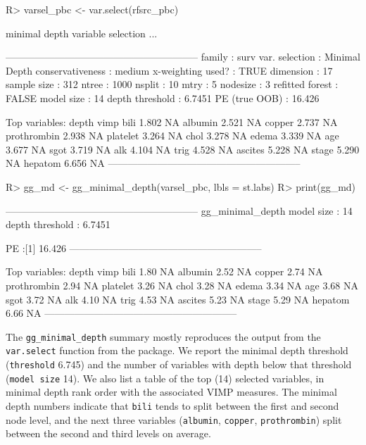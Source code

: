 \documentclass[article]{jss}
\begin{document}
\begin{Schunk}
\begin{Sinput}
R> varsel_pbc <- var.select(rfsrc_pbc)
\end{Sinput}
\begin{Soutput}
minimal depth variable selection ...


-----------------------------------------------------------
family             : surv 
var. selection     : Minimal Depth 
conservativeness   : medium 
x-weighting used?  : TRUE 
dimension          : 17 
sample size        : 312 
ntree              : 1000 
nsplit             : 10 
mtry               : 5 
nodesize           : 3 
refitted forest    : FALSE 
model size         : 14 
depth threshold    : 6.7451 
PE (true OOB)      : 16.426 


Top variables:
            depth vimp
bili        1.802   NA
albumin     2.521   NA
copper      2.737   NA
prothrombin 2.938   NA
platelet    3.264   NA
chol        3.278   NA
edema       3.339   NA
age         3.677   NA
sgot        3.719   NA
alk         4.104   NA
trig        4.528   NA
ascites     5.228   NA
stage       5.290   NA
hepatom     6.656   NA
-----------------------------------------------------------
\end{Soutput}
\begin{Sinput}
R> gg_md <- gg_minimal_depth(varsel_pbc, lbls = st.labs)
R> print(gg_md)
\end{Sinput}
\begin{Soutput}
-----------------------------------------------------------
gg_minimal_depth
model size         : 14 
depth threshold    : 6.7451 

PE :[1] 16.426
-----------------------------------------------------------

Top variables:
            depth vimp
bili         1.80   NA
albumin      2.52   NA
copper       2.74   NA
prothrombin  2.94   NA
platelet     3.26   NA
chol         3.28   NA
edema        3.34   NA
age          3.68   NA
sgot         3.72   NA
alk          4.10   NA
trig         4.53   NA
ascites      5.23   NA
stage        5.29   NA
hepatom      6.66   NA
-----------------------------------------------------------
\end{Soutput}
\end{Schunk}

The \texttt{gg\_minimal\_depth} summary mostly reproduces the output
from the \texttt{var.select} function from the 
package. We report the minimal depth threshold (\texttt{threshold}
6.745) and the number of variables with depth below that threshold
(\texttt{model\ size} 14). We also list a table of the top (14) selected
variables, in minimal depth rank order with the associated VIMP
measures. The minimal depth numbers indicate that \texttt{bili} tends to
split between the first and second node level, and the next three
variables (\texttt{albumin}, \texttt{copper}, \texttt{prothrombin})
split between the second and third levels on average.
\end{document}
